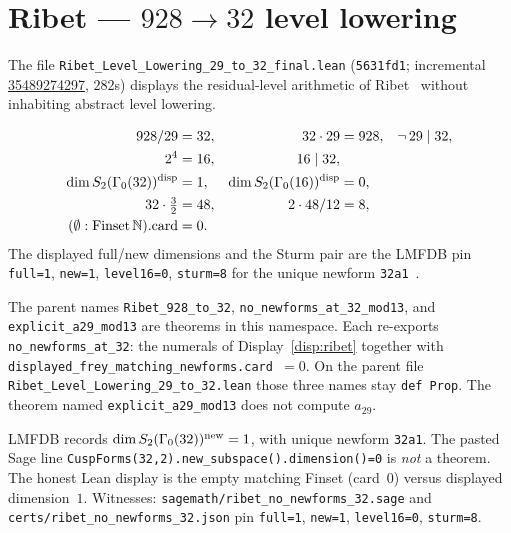 \section{Ribet --- $928\to 32$ level lowering}\label{sec:ribet}

The file
\texttt{Ribet\_Level\_Lowering\_29\_to\_32\_final.lean}
(\texttt{5631fd1}; incremental
\href{https://github.com/DavidFox998/beal-level-26-foundations/actions/runs/35489274297}{35489274297},
$282$s) displays the residual-level arithmetic of
Ribet~\cite{ribet1990} without inhabiting abstract level lowering.

\begin{displaythm}
\label{disp:ribet}
\[
\begin{aligned}
  928/29&=32, &
  32\cdot 29&=928, &
  \neg\,29\mid 32,\\
  2^4&=16, &
  16\mid 32,\\
  \dim S_2(\Gamma_0(32))^{\mathrm{disp}}&=1, &
  \dim S_2(\Gamma_0(16))^{\mathrm{disp}}&=0,\\
  32\cdot\tfrac{3}{2}&=48, &
  2\cdot 48/12&=8,\\
  (\emptyset:\mathrm{Finset}\,\mathbb{N}).\mathrm{card}&=0.
\end{aligned}
\]
The displayed full/new dimensions and the Sturm pair are the LMFDB
pin \texttt{full=1}, \texttt{new=1}, \texttt{level16=0},
\texttt{sturm=8} for the unique newform \texttt{32a1}~\cite{lmfdb}.
\end{displaythm}

The parent names \texttt{Ribet\_928\_to\_32},
\texttt{no\_newforms\_at\_32\_mod13}, and
\texttt{explicit\_a29\_mod13} are theorems in this namespace. Each
re-exports \texttt{no\_newforms\_at\_32}: the numerals of
Display~\ref{disp:ribet} together with
\texttt{displayed\_frey\_matching\_newforms.card $= 0$}. On the
parent file \texttt{Ribet\_Level\_Lowering\_29\_to\_32.lean} those
three names stay \texttt{def Prop}. The theorem named
\texttt{explicit\_a29\_mod13} does not compute $a_{29}$.

\begin{honesty}
LMFDB records $\dim S_2(\Gamma_0(32))^{\mathrm{new}}=1$, with unique
newform \texttt{32a1}. The pasted Sage line
\texttt{CuspForms(32,2).new\_subspace().dimension()=0} is
\emph{not} a theorem. The honest Lean display is the empty matching
Finset (card~$0$) versus displayed dimension~$1$. Witnesses:
\texttt{sagemath/ribet\_no\_newforms\_32.sage} and
\texttt{certs/ribet\_no\_newforms\_32.json} pin
\texttt{full=1}, \texttt{new=1}, \texttt{level16=0},
\texttt{sturm=8}.
\end{honesty}

